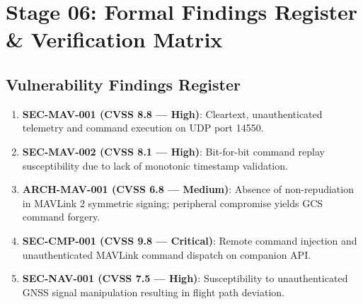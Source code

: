 \documentclass[11pt,a4paper]{article}
\begin{document}
\section{Stage 06: Formal Findings Register \& Verification Matrix}

\subsection{Vulnerability Findings Register}
\begin{enumerate}
    \item \textbf{SEC-MAV-001 (CVSS 8.8 --- High)}: Cleartext, unauthenticated telemetry and command execution on UDP port 14550.
    \item \textbf{SEC-MAV-002 (CVSS 8.1 --- High)}: Bit-for-bit command replay susceptibility due to lack of monotonic timestamp validation.
    \item \textbf{ARCH-MAV-001 (CVSS 6.8 --- Medium)}: Absence of non-repudiation in MAVLink 2 symmetric signing; peripheral compromise yields GCS command forgery.
    \item \textbf{SEC-CMP-001 (CVSS 9.8 --- Critical)}: Remote command injection and unauthenticated MAVLink command dispatch on companion API.
    \item \textbf{SEC-NAV-001 (CVSS 7.5 --- High)}: Susceptibility to unauthenticated GNSS signal manipulation resulting in flight path deviation.
\end{enumerate}
\end{document}
